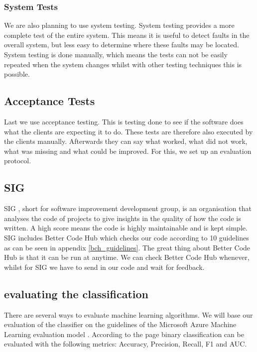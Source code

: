 \subsubsection{System Tests}
We are also planning to use system testing. System testing provides a more complete test of the entire system. This means it is useful to detect faults in the overall system, but less easy to determine where these faults may be located. System testing is done manually, which means the tests can not be easily repeated when the system changes whilst with other testing techniques this is possible.

\subsection{Acceptance Tests}
Last we use acceptance testing. This is testing done to see if the software does what the clients are expecting it to do. These tests are therefore also executed by the clients manually. Afterwards they can say what worked, what did not work, what was missing and what could be improved. For this, we set up an evaluation protocol.\\

\subsection{SIG}
SIG \cite{sig}, short for software improvement development group, is an organisation that analyses the code of projects to give insights in the quality of how the code is written. A high score means the code is highly maintainable and is kept simple. SIG includes Better Code Hub \cite{better_code_hub} which checks our code according to 10 guidelines as can be seen in appendix \ref{bch_guidelines}. The great thing about Better Code Hub is that it can be run at anytime. We can check Better Code Hub whenever, whilst for SIG we have to send in our code and wait for feedback.

\subsection{evaluating the classification}
There are several ways to evaluate machine learning algorithms. We will base our evaluation of the classifier on the guidelines of the Microsoft Azure Machine Learning evaluation model \cite{EvualteML}. According to the page binary classification can be evaluated with the following metrics: Accuracy, Precision, Recall, F1 and AUC.

